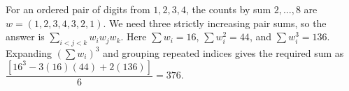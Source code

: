 For an ordered pair of digits from $1,2,3,4$, the counts by sum $2,\ldots,8$ are $w=(1,2,3,4,3,2,1)$. We need three strictly increasing pair sums, so the answer is $\sum_{i<j<k}w_iw_jw_k$. Here $\sum w_i=16$, $\sum w_i^2=44$, and $\sum w_i^3=136$. Expanding $(\sum w_i)^3$ and grouping repeated indices gives the required sum as $\dfrac{[16^3-3(16)(44)+2(136)]}{6}=\boxed{376}$.

